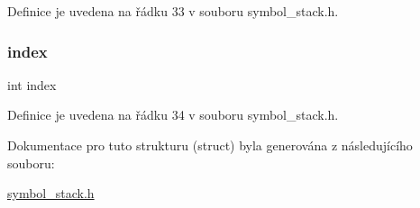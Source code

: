 Definice je uvedena na řádku 33 v souboru symbol\+\_\+stack.\+h.

\mbox{\label{struct_s___symbol_stack_a750b5d744c39a06bfb13e6eb010e35d0}} 
\subsubsection{\texorpdfstring{index}{index}}
{\footnotesize\ttfamily int index}



Definice je uvedena na řádku 34 v souboru symbol\+\_\+stack.\+h.



Dokumentace pro tuto strukturu (struct) byla generována z následujícího souboru\+:\begin{DoxyCompactItemize}
\item 
\hyperlink{symbol__stack_8h}{symbol\+\_\+stack.\+h}\end{DoxyCompactItemize}

